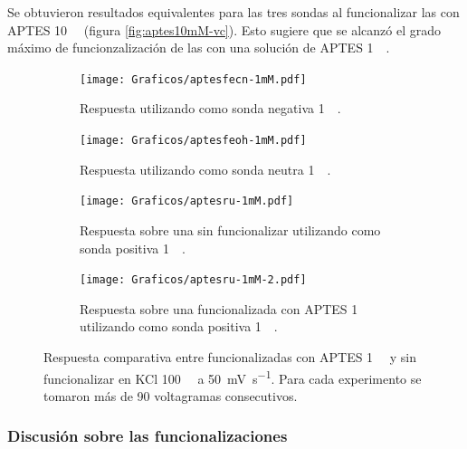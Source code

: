 		  Se obtuvieron resultados equivalentes para las tres sondas al funcionalizar las \pdmZ\space con APTES \SI{10}{\milli\Molar} (figura \ref{fig:aptes10mM-vc}). Esto sugiere que se alcanzó el grado máximo de funcionzalización de las \pdmZ\space con una solución de APTES \SI{1}{\milli\Molar}.


				 \begin{figure}[h!]	
					\begin{subfigure}[t]{0.495\textwidth}
			 	    \texttt{[image: Graficos/aptesfecn-1mM.pdf]}
			        \caption{Respuesta utilizando como sonda negativa \ferroferri\space \SI{1}{\milli\Molar}.}
			        \vspace*{2mm}
			        \label{fig:aptes1mM-vc-fe}
			        \end{subfigure}
			        \begin{subfigure}[t]{0.495\textwidth}
			 	    \texttt{[image: Graficos/aptesfeoh-1mM.pdf]}
			        \caption{Respuesta utilizando como sonda neutra \fc\space \SI{1}{\milli\Molar}.}
			        \vspace*{2mm}
			        \label{fig:aptes1mM-vc-fc}
			        \end{subfigure}
			        \vspace*{1mm}\begin{subfigure}[t]{0.495\textwidth}
			 	    \texttt{[image: Graficos/aptesru-1mM.pdf]}
			        \caption{Respuesta sobre una \pdmZ\space sin funcionalizar utilizando como sonda positiva \aminorutenio\space \SI{1}{\milli\Molar}.}
			        \label{fig:aptes1mM-vc-ru}
			        \end{subfigure}
			        \vspace*{1mm}\begin{subfigure}[t]{0.495\textwidth}
			 	    \texttt{[image: Graficos/aptesru-1mM-2.pdf]}
			        \caption{Respuesta sobre una \pdmZ\space funcionalizada con APTES \SI{1}{\milli\Molar} utilizando como sonda positiva \aminorutenio\space \SI{1}{\milli\Molar}.}
			        \label{fig:aptes1mM-vc-ru2}
			        \end{subfigure}
			        \caption[Voltagramas de \pdmZ$^P_3$ con \aminorutenio\space y \ferroferri]{Respuesta comparativa entre \pdmZ\space funcionalizadas con APTES \SI{1}{\milli\Molar} y sin funcionalizar en KCl \SI{100}{\milli\Molar} a \SI{50}{\milli\volt\per\second}. Para cada experimento se tomaron más de 90 voltagramas consecutivos.}
			        \label{fig:aptes1mM-vc}
			      	\end{figure}

	 	\subsubsection{Discusión sobre las funcionalizaciones}

